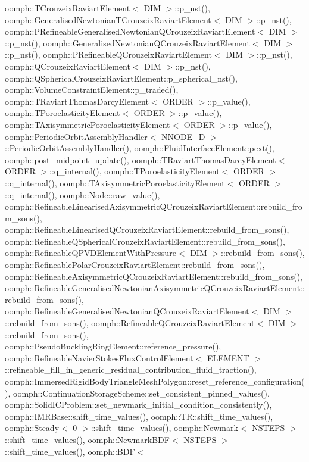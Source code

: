 oomph\+::\+T\+Crouzeix\+Raviart\+Element$<$ D\+I\+M $>$\+::p\+\_\+nst(), oomph\+::\+Generalised\+Newtonian\+T\+Crouzeix\+Raviart\+Element$<$ D\+I\+M $>$\+::p\+\_\+nst(), oomph\+::\+P\+Refineable\+Generalised\+Newtonian\+Q\+Crouzeix\+Raviart\+Element$<$ D\+I\+M $>$\+::p\+\_\+nst(), oomph\+::\+Generalised\+Newtonian\+Q\+Crouzeix\+Raviart\+Element$<$ D\+I\+M $>$\+::p\+\_\+nst(), oomph\+::\+P\+Refineable\+Q\+Crouzeix\+Raviart\+Element$<$ D\+I\+M $>$\+::p\+\_\+nst(), oomph\+::\+Q\+Crouzeix\+Raviart\+Element$<$ D\+I\+M $>$\+::p\+\_\+nst(), oomph\+::\+Q\+Spherical\+Crouzeix\+Raviart\+Element\+::p\+\_\+spherical\+\_\+nst(), oomph\+::\+Volume\+Constraint\+Element\+::p\+\_\+traded(), oomph\+::\+T\+Raviart\+Thomas\+Darcy\+Element$<$ O\+R\+D\+E\+R $>$\+::p\+\_\+value(), oomph\+::\+T\+Poroelasticity\+Element$<$ O\+R\+D\+E\+R $>$\+::p\+\_\+value(), oomph\+::\+T\+Axisymmetric\+Poroelasticity\+Element$<$ O\+R\+D\+E\+R $>$\+::p\+\_\+value(), oomph\+::\+Periodic\+Orbit\+Assembly\+Handler$<$ N\+N\+O\+D\+E\+\_\+D $>$\+::\+Periodic\+Orbit\+Assembly\+Handler(), oomph\+::\+Fluid\+Interface\+Element\+::pext(), oomph\+::post\+\_\+midpoint\+\_\+update(), oomph\+::\+T\+Raviart\+Thomas\+Darcy\+Element$<$ O\+R\+D\+E\+R $>$\+::q\+\_\+internal(), oomph\+::\+T\+Poroelasticity\+Element$<$ O\+R\+D\+E\+R $>$\+::q\+\_\+internal(), oomph\+::\+T\+Axisymmetric\+Poroelasticity\+Element$<$ O\+R\+D\+E\+R $>$\+::q\+\_\+internal(), oomph\+::\+Node\+::raw\+\_\+value(), oomph\+::\+Refineable\+Linearised\+Axisymmetric\+Q\+Crouzeix\+Raviart\+Element\+::rebuild\+\_\+from\+\_\+sons(), oomph\+::\+Refineable\+Linearised\+Q\+Crouzeix\+Raviart\+Element\+::rebuild\+\_\+from\+\_\+sons(), oomph\+::\+Refineable\+Q\+Spherical\+Crouzeix\+Raviart\+Element\+::rebuild\+\_\+from\+\_\+sons(), oomph\+::\+Refineable\+Q\+P\+V\+D\+Element\+With\+Pressure$<$ D\+I\+M $>$\+::rebuild\+\_\+from\+\_\+sons(), oomph\+::\+Refineable\+Polar\+Crouzeix\+Raviart\+Element\+::rebuild\+\_\+from\+\_\+sons(), oomph\+::\+Refineable\+Axisymmetric\+Q\+Crouzeix\+Raviart\+Element\+::rebuild\+\_\+from\+\_\+sons(), oomph\+::\+Refineable\+Generalised\+Newtonian\+Axisymmetric\+Q\+Crouzeix\+Raviart\+Element\+::rebuild\+\_\+from\+\_\+sons(), oomph\+::\+Refineable\+Generalised\+Newtonian\+Q\+Crouzeix\+Raviart\+Element$<$ D\+I\+M $>$\+::rebuild\+\_\+from\+\_\+sons(), oomph\+::\+Refineable\+Q\+Crouzeix\+Raviart\+Element$<$ D\+I\+M $>$\+::rebuild\+\_\+from\+\_\+sons(), oomph\+::\+Pseudo\+Buckling\+Ring\+Element\+::reference\+\_\+pressure(), oomph\+::\+Refineable\+Navier\+Stokes\+Flux\+Control\+Element$<$ E\+L\+E\+M\+E\+N\+T $>$\+::refineable\+\_\+fill\+\_\+in\+\_\+generic\+\_\+residual\+\_\+contribution\+\_\+fluid\+\_\+traction(), oomph\+::\+Immersed\+Rigid\+Body\+Triangle\+Mesh\+Polygon\+::reset\+\_\+reference\+\_\+configuration(), oomph\+::\+Continuation\+Storage\+Scheme\+::set\+\_\+consistent\+\_\+pinned\+\_\+values(), oomph\+::\+Solid\+I\+C\+Problem\+::set\+\_\+newmark\+\_\+initial\+\_\+condition\+\_\+consistently(), oomph\+::\+I\+M\+R\+Base\+::shift\+\_\+time\+\_\+values(), oomph\+::\+T\+R\+::shift\+\_\+time\+\_\+values(), oomph\+::\+Steady$<$ 0 $>$\+::shift\+\_\+time\+\_\+values(), oomph\+::\+Newmark$<$ N\+S\+T\+E\+P\+S $>$\+::shift\+\_\+time\+\_\+values(), oomph\+::\+Newmark\+B\+D\+F$<$ N\+S\+T\+E\+P\+S $>$\+::shift\+\_\+time\+\_\+values(), oomph\+::\+B\+D\+F$<$ 